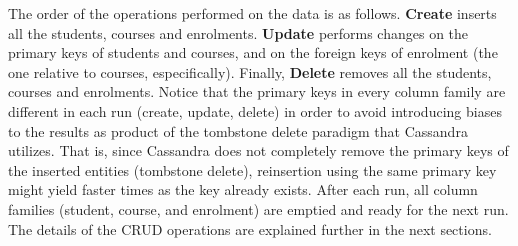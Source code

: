 The order of the operations performed on the data is as follows. \textbf{Create}
inserts all the students, courses and enrolments. \textbf{Update} performs
changes on the primary keys of students and courses, and on the foreign keys
of enrolment (the one relative to courses, especifically). Finally,
\textbf{Delete} removes all the students, courses and enrolments.  Notice that
the primary keys in every column family  are different in each run (create,
update, delete) in order to avoid  introducing biases to the results as product
of the tombstone delete paradigm  that Cassandra utilizes. That is, since
Cassandra does not completely  remove the primary keys of the inserted entities
(tombstone delete), reinsertion  using the same primary key might yield faster
times as the key already exists. After  each run, all column families (student,
course, and enrolment) are emptied and  ready for the next run.  The details  of
the \ac{CRUD} operations are explained further in the next sections.
		
